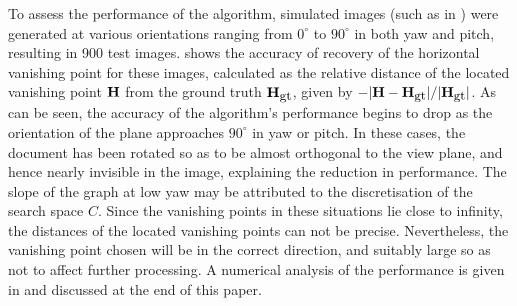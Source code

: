 {%

To assess the performance of the algorithm, simulated images (such as in ) were generated at various orientations ranging from $0^\circ$ to $90^\circ$ in both yaw and pitch, resulting in 900 test images.
 shows the accuracy of recovery of the horizontal vanishing point for these images,
calculated as the relative distance of the located vanishing point ${ \bf H }$ from the ground truth ${ \bf H }_{\mbox{\small gt}}$, given by $-|{ \bf H }-{ \bf H }_{\mbox{\small gt}}| / | { \bf H }_{\mbox{\small gt}} | $.
As can be seen, the accuracy of the algorithm's performance begins to drop as the orientation of the plane approaches $90^\circ$ in yaw or pitch.
In these cases, the document has been rotated so as to be almost orthogonal to the view plane, and hence nearly invisible in the image, explaining the reduction in performance.
The slope of the graph at low yaw may be attributed to the discretisation of the search space $C$.
Since the vanishing points in these situations lie close to infinity, the distances of the located vanishing points can not be precise.
Nevertheless, the vanishing point chosen will be in the correct direction, and suitably large so as not to affect further processing.
A numerical analysis of the performance is given in  and discussed at the end of this paper.
}

